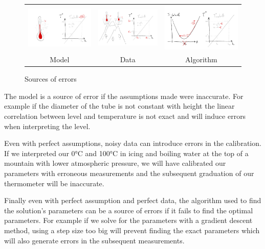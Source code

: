 \begin{bibunit}
\begin{figure}
\begin{tabular}{c |c|c}
     \hspace{-.15\linewidth}\includegraphics[width=.4\linewidth]{Introduction/pics/model_err_w_source.png}  &
     \includegraphics[width=.4\linewidth]{Introduction/pics/data_err_w_source.png} &
     \includegraphics[width=.4\linewidth]{Introduction/pics/optim_err_w_source.png} \\
     \hspace{-.15\linewidth}Model &  Data &  Algorithm \\
\end{tabular}
    \centering
    \caption{Sources of errors}
    \label{fig:err_sources}
\end{figure}
 The model is a source of error if the assumptions made were inaccurate. For example if the diameter of the tube is not constant with height the linear correlation between level and temperature is not exact and will induce errors when interpreting the level.

 Even with perfect assumptions, noisy data can introduce errors in the calibration. If we interpreted our 0°C and 100°C in icing and boiling water at the top of a mountain with lower atmospheric pressure, we will have calibrated our parameters with erroneous measurements and the subsequent graduation of our thermometer will be inaccurate.

 Finally even with perfect assumption and perfect data, the algorithm used to find the solution's parameters can be a source of errors if it fails to find the optimal parameters. For example if we solve for the parameters with a gradient descent method, using a step size too big will prevent finding the exact parameters which will also generate errors in the subsequent measurements.


\end{bibunit}
